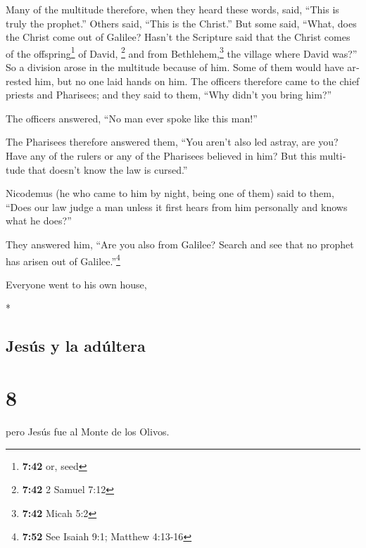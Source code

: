 \begin{paracol}{2}
\begin{otherlanguage}{english}
 Many of the multitude therefore, when they heard these
words, said, ``This is truly the prophet.''  Others said,
``This is the Christ.'' But some said, ``What, does the Christ come out
of Galilee?  Hasn't the Scripture said that the Christ
comes of the offspring\footnote{\textbf{7:42} or, seed} of David,
\footnote{\textbf{7:42} 2 Samuel 7:12} and from Bethlehem,\footnote{\textbf{7:42}
  Micah 5:2} the village where David was?''  So a
division arose in the multitude because of him.  Some of
them would have arrested him, but no one laid hands on him.
 The officers therefore came to the chief priests and
Pharisees; and they said to them, ``Why didn't you bring him?''

 The officers answered, ``No man ever spoke like this
man!''

 The Pharisees therefore answered them, ``You aren't also
led astray, are you?  Have any of the rulers or any of
the Pharisees believed in him?  But this multitude that
doesn't know the law is cursed.''

 Nicodemus (he who came to him by night, being one of
them) said to them,  ``Does our law judge a man unless it
first hears from him personally and knows what he does?''

 They answered him, ``Are you also from Galilee? Search
and see that no prophet has arisen out of Galilee.''\footnote{\textbf{7:52}
  See Isaiah 9:1; Matthew 4:13-16}

 Everyone went to his own house,

\end{otherlanguage}

\switchcolumn[0]*

\hypertarget{jesuxfas-y-la-aduxfaltera}{%
\subsection{Jesús y la adúltera}\label{jesuxfas-y-la-aduxfaltera}}

\hypertarget{section-14}{%
\section{8}\label{section-14}}

 pero Jesús fue al Monte de los Olivos.


\end{paracol}
